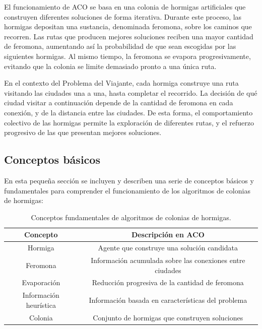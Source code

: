 El funcionamiento de ACO se basa en una colonia de hormigas artificiales que construyen diferentes soluciones de forma 
iterativa. Durante este proceso, las hormigas depositan una sustancia, denominada feromona, sobre los caminos que recorren.
Las rutas que producen mejores soluciones reciben una mayor cantidad de feromona, aumentando así la probabilidad de que sean 
escogidas por las siguientes hormigas. Al mismo tiempo, la feromona se evapora progresivamente, evitando que la colonia se 
limite demasiado pronto a una única ruta.

En el contexto del Problema del Viajante, cada hormiga construye una ruta visitando las ciudades una a una, hasta completar 
el recorrido. La decisión de qué ciudad visitar a continuación depende de la cantidad de feromona en cada conexión, y de la 
distancia entre las ciudades. De esta forma, el comportamiento colectivo de las hormigas permite la exploración de diferentes
rutas, y el refuerzo progresivo de las que presentan mejores soluciones.

\subsection{Conceptos básicos}
\label{subsec:aco_concepts}

En esta pequeña sección se incluyen y describen una serie de conceptos básicos y fundamentales para comprender el funcionamiento 
de los algoritmos de colonias de hormigas:

\begin{table}[ht]
    \renewcommand{\arraystretch}{1.3}
    \caption{Conceptos fundamentales de algoritmos de colonias de hormigas.}
    \label{tab:aco_concepts}
    \begin{center}
        \begin{tabular}{|c|c|}
            \hline
            \textbf{Concepto} & \textbf{Descripción en ACO} \\
            \hline
            Hormiga & Agente que construye una solución candidata \\
            \hline
            Feromona & Información acumulada sobre las conexiones entre ciudades \\
            \hline
            Evaporación & Reducción progresiva de la cantidad de feromona \\
            \hline
            Información heurística & Información basada en características del problema \\
            \hline
            Colonia & Conjunto de hormigas que construyen soluciones \\
            \hline
        \end{tabular}
    \end{center}
\end{table}


